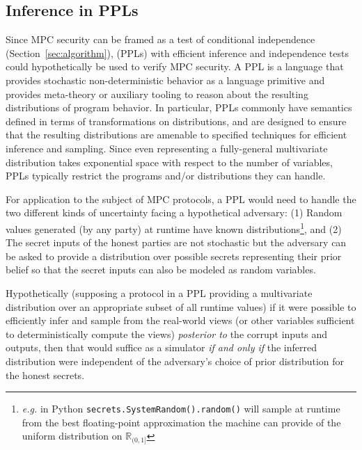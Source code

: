 \documentclass[acmlarge, manuscript, screen, review, anonymous, table]{acmart}
\newcommand{\eg}{\textit{e.g.}\xspace}
\begin{document}
\subsection{Inference in PPLs}

Since MPC security can be framed as a test of conditional independence
(Section~\ref{sec:algorithm}),
 (PPLs) with efficient inference and independence tests could hypothetically be used to verify MPC security.
%
A PPL is a language that provides stochastic non-deterministic behavior as a language primitive
and provides meta-theory or auxiliary tooling to reason about the resulting distributions of program behavior.
In particular, PPLs commonly have semantics defined in terms of transformations on distributions,
and are designed to ensure that the resulting distributions are amenable to specified techniques for efficient
inference and sampling. Since even representing a fully-general multivariate distribution takes exponential space with respect to the number of variables,
PPLs typically restrict the programs and/or distributions they can handle.

For application to the subject of MPC protocols, a PPL would need to handle the two different kinds of uncertainty facing a hypothetical adversary:
(1) Random values generated (by any party) at runtime have known distributions\footnote{
    \eg in Python \texttt{secrets.SystemRandom().random()}
    will sample at runtime from the best floating-point approximation the machine can provide
    of the uniform distribution on $\mathbb{R}_{(0,1]}$
}, and
(2) The secret inputs of the honest parties are not stochastic but the adversary can be asked to provide a distribution over
possible secrets representing their prior belief so that the secret inputs can also be modeled as random variables.

Hypothetically (supposing a protocol in a PPL providing a multivariate distribution over an appropriate subset of all runtime values)
if it were possible to efficiently infer and sample from the real-world views
(or other variables sufficient to deterministically compute the views)
\emph{posterior to} the corrupt inputs and outputs,
then that would suffice as a simulator
\emph{if and only if} the inferred distribution were independent of the adversary's choice of prior distribution for the honest secrets.
\end{document}
